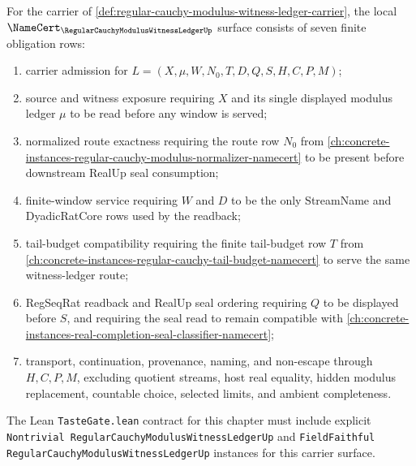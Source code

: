 \begin{theorem}
\label{thm:regular-cauchy-modulus-witness-ledger-namecert-obligations}
For the carrier of \autoref{def:regular-cauchy-modulus-witness-ledger-carrier}, the local $\NameCert_{\RegularCauchyModulusWitnessLedgerUp}$ surface consists of seven finite obligation rows:
\begin{enumerate}
\item carrier admission for $L=(X,\mu,W,N_0,T,D,Q,S,H,C,P,M)$;
\item source and witness exposure requiring $X$ and its single displayed modulus ledger $\mu$ to be read before any window is served;
\item normalized route exactness requiring the route row $N_0$ from \autoref{ch:concrete-instances-regular-cauchy-modulus-normalizer-namecert} to be present before downstream RealUp seal consumption;
\item finite-window service requiring $W$ and $D$ to be the only StreamName and DyadicRatCore rows used by the readback;
\item tail-budget compatibility requiring the finite tail-budget row $T$ from \autoref{ch:concrete-instances-regular-cauchy-tail-budget-namecert} to serve the same witness-ledger route;
\item RegSeqRat readback and RealUp seal ordering requiring $Q$ to be displayed before $S$, and requiring the seal read to remain compatible with \autoref{ch:concrete-instances-real-completion-seal-classifier-namecert};
\item transport, continuation, provenance, naming, and non-escape through $H,C,P,M$, excluding quotient streams, host real equality, hidden modulus replacement, countable choice, selected limits, and ambient completeness.
\end{enumerate}
The Lean \texttt{TasteGate.lean} contract for this chapter must include explicit \texttt{Nontrivial RegularCauchyModulusWitnessLedgerUp} and \texttt{FieldFaithful RegularCauchyModulusWitnessLedgerUp} instances for this carrier surface.
\end{theorem}
